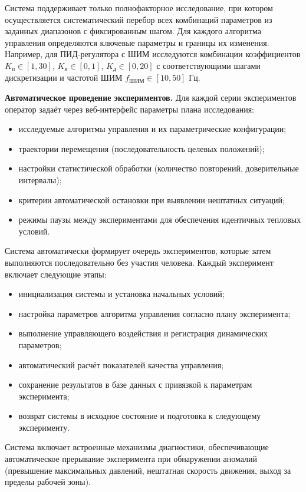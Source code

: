 Система поддерживает только полнофакторное исследование, при котором осуществляется систематический перебор
всех комбинаций параметров из заданных диапазонов с фиксированным шагом. Для каждого алгоритма
управления определяются ключевые параметры и границы их изменения. Например, для ПИД-регулятора
с ШИМ исследуются комбинации коэффициентов $K_{\text{п}} \in [1, 30]$, $K_{\text{и}} \in [0, 1]$,
$K_{\text{д}} \in [0, 20]$ с соответствующими шагами дискретизации и частотой ШИМ
$f_{\text{ШИМ}} \in [10, 50]$ Гц.

\textbf{Автоматическое проведение экспериментов.} Для каждой серии экспериментов оператор задаёт
через веб-интерфейс параметры плана исследования:

\begin{itemize}
	\item исследуемые алгоритмы управления и их параметрические конфигурации;
	\item траектории перемещения (последовательность целевых положений);
	\item настройки статистической обработки (количество повторений, доверительные интервалы);
	\item критерии автоматической остановки при выявлении нештатных ситуаций;
	\item режимы паузы между экспериментами для обеспечения идентичных тепловых условий.
\end{itemize}

Система автоматически формирует очередь экспериментов, которые затем выполняются
последовательно без участия человека. Каждый эксперимент включает следующие этапы:

\begin{itemize}
	\item инициализация системы и установка начальных условий;
	\item настройка параметров алгоритма управления согласно плану эксперимента;
	\item выполнение управляющего воздействия и регистрация динамических параметров;
	\item автоматический расчёт показателей качества управления;
	\item сохранение результатов в базе данных с привязкой к параметрам эксперимента;
	\item возврат системы в исходное состояние и подготовка к следующему эксперименту.
\end{itemize}

Система включает встроенные механизмы диагностики, обеспечивающие автоматическое прерывание эксперимента
при обнаружении аномалий (превышение максимальных давлений, нештатная скорость движения, выход за пределы рабочей зоны).

